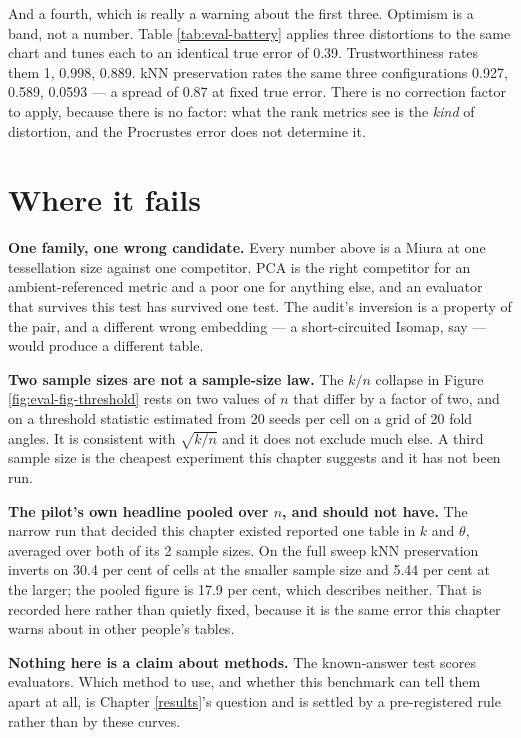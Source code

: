 \documentclass[
  british,
  a4paper,
]{book}
\begin{document}
And a fourth, which is really a warning about the first three. Optimism is a
band, not a number. Table \ref{tab:eval-battery} applies three
distortions to the same chart and tunes each to an identical true error of
0.39. Trustworthiness rates them
1, 0.998, 0.889. kNN preservation rates the
same three configurations 0.927, 0.589, 0.0593 ---
a spread of 0.87 at fixed true error. There
is no correction factor to apply, because there is no factor: what the rank
metrics see is the \emph{kind} of distortion, and the Procrustes error does not
determine it.

\section{Where it fails}\label{eval-limits}

\textbf{One family, one wrong candidate.} Every number above is a Miura at one
tessellation size against one competitor. PCA is the right competitor for an
ambient-referenced metric and a poor one for anything else, and an evaluator
that survives this test has survived one test. The audit's inversion is a
property of the pair, and a different wrong embedding --- a short-circuited
Isomap, say --- would produce a different table.

\textbf{Two sample sizes are not a sample-size law.} The \(k/n\) collapse in Figure
\ref{fig:eval-fig-threshold} rests on two values of \(n\) that differ by a factor
of two, and on a threshold statistic estimated from 20 seeds
per cell on a grid of 20 fold angles. It is consistent with
\(\sqrt{k/n}\) and it does not exclude much else. A third sample size is the
cheapest experiment this chapter suggests and it has not been run.

\textbf{The pilot's own headline pooled over \(n\), and should not have.} The narrow
run that decided this chapter existed reported one table in \(k\) and \(\theta\),
averaged over both of its 2 sample sizes.
On the full sweep kNN preservation inverts on
30.4
per cent of cells at the smaller sample size and
5.44 per
cent at the larger; the pooled figure is
17.9 per cent, which
describes neither. That is recorded here rather than quietly fixed, because it
is the same error this chapter warns about in other people's tables.

\textbf{Nothing here is a claim about methods.} The known-answer test scores
evaluators. Which method to use, and whether this benchmark can tell them apart
at all, is Chapter \ref{results}'s question and is settled by a pre-registered
rule rather than by these curves.
\end{document}
